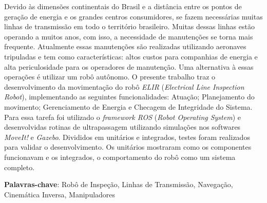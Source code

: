 \begin{thesisresumo}
	
Devido às dimensões continentais do Brasil e a distância entre os pontos de geração de energia e os grandes centros consumidores, se fazem necessárias muitas linhas de transmissão em todo o território brasileiro. Muitas dessas linhas estão operando a muitos anos, com isso, a necessidade de manutenções se torna mais frequente. Atualmente essas manutenções são realizadas utilizando aeronaves tripuladas e tem como características: altos custos para companhias de energia e alta periculosidade para os operadores de manutenção. Uma alternativa à essas operações é utilizar um robô autônomo.
O presente trabalho traz o desenvolvimento da movimentação do robô \textit{ELIR} (\textit{Electrical Line Inspection Robot}), implementando as seguintes funcionalidades: Atuação; Planejamento do movimento; Gerenciamento de Energia e Checagem de Integridade do Sistema. Para essa tarefa foi utilizado o \textit{framework ROS} (\textit{Robot Operating System}) e desenvolvidas rotinas de ultrapassagem utilizando simulações nos softwares \textit{MoveIt!} e \textit{Gazebo}. Divididos em unitários e integrados, testes foram realizados para validar o desenvolvimento. Os unitários mostraram como os componentes funcionavam e os integrados, o comportamento do robô como um sistema completo.   





\textbf{Palavras-chave}: Robô de Inspeção, Linhas de Transmissão, Navegação, Cinemática Inversa, Manipuladores

\end{thesisresumo}
